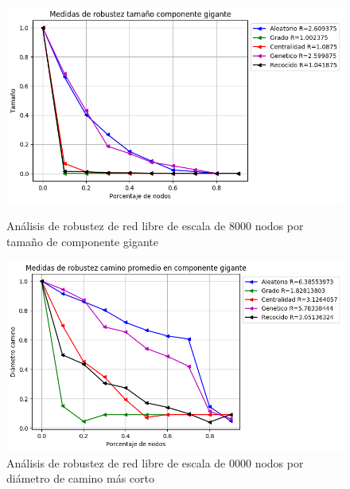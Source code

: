 \begin{figure}[!htb]
    \begin{minipage}{0.48\textwidth}
        \centering
        \includegraphics[scale=0.4]{CapituloAAnexos/imagenesAnexoC/Robustez/grafica_GC20180512_143117ScaleFree8000Nodes}
        \caption{Análisis de robustez de red libre de escala de 8000 nodos por tamaño de componente gigante}
    \end{minipage}\hfill
   \begin{minipage}{0.48\textwidth}
         \centering
       \includegraphics[scale=0.4]{CapituloAAnexos/imagenesAnexoC/Robustez/grafica_APL20180512_143117ScaleFree8000Nodes}
        \caption{Análisis de robustez de red libre de escala de 0000 nodos por diámetro de camino más corto}
    \end{minipage}
\end{figure}



